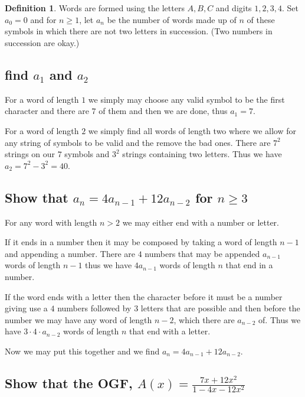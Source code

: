 \documentclass{article}
\theoremstyle{definition}
\newtheorem{definition}{Definition}[section]
\begin{document}
	\section{}
	\begin{definition}{Words}
		are formed using the letters $A, B, C$ and digits $1,2,3,4$. Set $a_0= 0$ and for $n\ge1$, let $a_n$ be the number of words made up of $n$ of these symbols in which there are not two letters in succession. (Two numbers in succession are okay.)
	\end{definition}
	
	\subsection{find $a_1$ and $a_2$}
	For a word of length $1$ we simply may choose any valid symbol to be the first character and there are $7$ of them and then we are done, thus $a_1 = 7$.
	
	For a word of length $2$ we simply find all words of length two where we allow for any string of symbols to be valid and the remove the bad ones. There are $7^2$ strings on our $7$ symbols and $3^2$ strings containing two letters. Thus we have $a_2 = 7^2-3^2=40$.
	
	\subsection{Show that $a_n = 4a_{n-1} + 12a_{n-2}$ for $n\ge3$}
	For any word with length $n > 2$ we may either end with a number or letter. 
	
	If it ends in a number then it may be composed by taking a word of length $n-1$ and appending a number. There are $4$ numbers that may be appended $a_{n-1}$ words of length $n-1$ thus we have $4a_{n-1}$ words of length $n$ that end in a number.
	
	If the word ends with a letter then the character before it must be a number giving use a $4$ numbers followed by $3$ letters that are possible and then before the number we may have any word of length $n-2$, which there are $a_{n-2}$ of. Thus we have $3\cdot4\cdot a_{n-2}$ words of length $n$ that end with a letter.
	
	Now we may put this together and we find $a_n = 4a_{n-1}+12a_{n-2}$.
	
	\subsection{Show that the OGF, $A(x) = \frac{7x+12x^2}{1-4x-12x^2}$}
	
\end{document}
